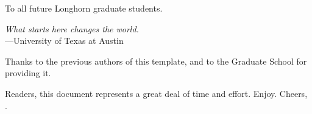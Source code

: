 

\copyrightpage  %

\commcertpage   %

\titlepage      %


\begin{dedication}		%
To all future Longhorn graduate students.
\end{dedication}

\begin{epigraph}		%
\begin{center}
    \textit{What starts here changes the world.}
    \\\hspace{4em}---University of Texas at Austin
\end{center}
\end{epigraph}

\begin{acknowledgments}		%
Thanks to the previous authors of this template, and to the Graduate School for providing it.
\end{acknowledgments}

\begin{preface}		%
Readers, this document represents a great deal of time and effort. Enjoy. Cheers, \theauthor.
\end{preface}

%
\utabstract


